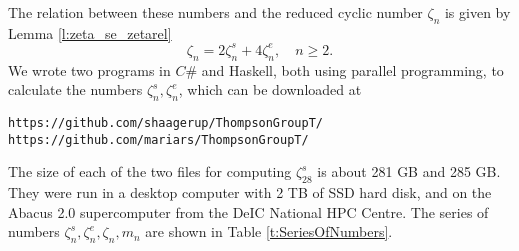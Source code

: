 \documentclass{amsart}
\theoremstyle{definition}
\begin{document}
The relation between these numbers and the reduced cyclic number $\zeta_n$ is given by Lemma \ref{l:zeta_se_zetarel}
$$
\zeta_{n}=2\zeta_{n}^s+4 \zeta_{n}^e,\quad n\ge2.
$$
We wrote two programs in $C\#$ and Haskell, both using parallel programming, to calculate the numbers 
$\zeta_{n}^s, \zeta_{n}^e$, which can be downloaded at
\begin{verbatim}
https://github.com/shaagerup/ThompsonGroupT/ 
https://github.com/mariars/ThompsonGroupT/
\end{verbatim}
The size of each of the two files for computing $\zeta_{28}^s$ is about {\color{black}281} GB and {\color{black}285} GB. They were run in a desktop computer with 2 TB of SSD hard disk, and on the Abacus 2.0 supercomputer 
from the DeIC National HPC Centre.
The series of numbers $\zeta_n^s, \zeta_n^e,\zeta_n, m_n$ are shown in Table \ref{t:SeriesOfNumbers}.
\end{document}
